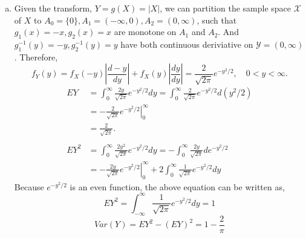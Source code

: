 \documentclass[letterpaper]{article}
\newcommand{\intii}{\int_{-\infty}^\infty}
\newcommand{\intzi}{\int_0^\infty}
\begin{document}
\begin{enumerate}[(a)]
    \item Given the transform, $Y = g(X) = |X|$, we can partition the sample space $\mathcal{X}$ of $X$ to $A_0 = \{0\}, A_1 = (-\infty, 0), A_2 = (0, \infty)$, such that $g_1(x) = -x, g_2(x) = x$ are monotone on $A_1$ and $A_2$. 
    And $g_1^{-1}(y) = -y, g_2^{-1}(y) = y$ have both continuous deriviative on $\mathcal{Y} = (0, \infty)$.
    Therefore,
    \[
    f_Y(y) = f_X(-y)\left|\frac{d-y}{dy}\right| + 
    f_X(y)\left|\frac{dy}{dy}\right| 
    = \frac{2}{\sqrt{2\pi}} e^{-y^2/2}, \quad 0 < y < \infty.
    \]
    \begin{align*}
    EY & = \intzi \frac{2y}{\sqrt{2\pi}} e^{-y^2/2} dy 
    = \intzi \frac{2}{\sqrt{2\pi}} e^{-y^2/2} d(y^2/2) \\
    & = -\frac{2}{\sqrt{2\pi}} \left. e^{-y^2/2} \right|_0^\infty \\
    & = \frac{2}{\sqrt{2\pi}}.\\
    \\
    EY^2 &= \intzi \frac{2y^2}{\sqrt{2\pi}} e^{-y^2/2} dy 
    = -\intzi \frac{2y}{\sqrt{2\pi}} de^{-y^2/2} \\
    & = -\left. \frac{2y}{\sqrt{2\pi}} e^{-y^2/2} \right|_0^\infty +
    2 \intzi \frac{1}{\sqrt{2\pi}} e^{-y^2/2} dy
    \end{align*}
    Because $e^{-y^2/2}$ is an even function, the above equation can be written as,
    \[
    EY^2 = \intii \frac{1}{\sqrt{2\pi}} e^{-y^2/2} dy = 1
    \]
    \[
    Var(Y) = EY^2 - (EY)^2 = 1 - \frac{2}{\pi}
    \]

    \end{enumerate}
\end{document}
